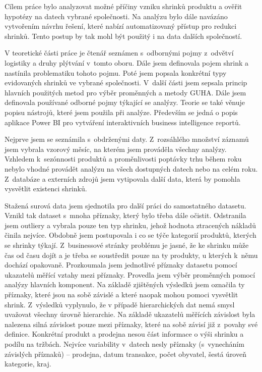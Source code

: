 Cílem práce bylo analyzovat možné příčiny vzniku shrinků produktu a ověřit hypotézy na datech vybrané společnosti. Na analýzu bylo dále navázáno vytvořením návrhu řešení, které nabízí automatizovaný přístup pro redukci shrinků. Tento postup by tak mohl být použitý i na data dalších společností.

V teoretické části práce je čtenář seznámen s~odbornými pojmy z~odvětví logistiky a druhy plýtvání v~tomto oboru. Dále jsem definovala pojem shrink a nastínila problematiku tohoto pojmu. Poté jsem popsala konkrétní typy evidovaných shrinků ve vybrané společnosti. V~další části jsem sepsala princip hlavních použitých metod pro výběr proměnných a metody GUHA. Dále jsem definovala používané odborné pojmy týkající se analýzy. Teorie se také věnuje popisu nástrojů, které jsem použila při analýze. Především se jedná o popis aplikace Power BI pro vytváření interaktivních business intelligence reportů.

Nejprve jsem se seznámila s~obdrženými daty. Z~rozsáhlého množství záznamů jsem vybrala vzorový měsíc, na kterém jsem prováděla všechny analýzy. Vzhledem k~sezónnosti produktů a proměnlivosti poptávky trhu během roku nebylo vhodné provádět analýzu na všech dostupných datech nebo na celém roku. Z~databáze a externích zdrojů jsem vytipovala další data, která by pomohla vysvětlit existenci shrinků.

Stažená surová data jsem sjednotila pro další práci do samostatného datasetu. Vznikl tak dataset s~mnoha příznaky, který bylo třeba dále očistit. Odstranila jsem outliery a vybrala pouze ten typ shrinku, jehož hodnota ztracených nákladů činila nejvíce. Obdobně jsem postupovala i co se týče kategorií produktů, kterých se shrinky týkají. Z~businessové stránky problému je jasné, že ke shrinku může čas od času dojít a je třeba se soustředit pouze na ty produkty, u kterých k~němu dochází opakovaně. 
Prozkoumala jsem jednotlivé příznaky datasetu pomocí ukazatelů měřící vztahy mezi příznaky. Provedla jsem výběr proměnných pomocí analýzy hlavních komponent. Na základě zjištěných výsledků jsem označila ty příznaky, které jsou na sobě závislé a které naopak mohou pomoci vysvětlit shrink. Z~výsledků vyplynulo, že v případě hierarchických dat nemá smysl uvažovat všechny úrovně hierarchie. Na základě ukazatelů měřících závislost byla nalezena silná závislost pouze mezi příznaky, které na sobě závisí již z~povahy své definice. Konkrétní produkt a prodejna nesou část informace o výši shrinku a podílu na tržbách. Nejvíce variability v~datech nesly příznaky (s~vynecháním závislých příznaků) -- prodejna, datum transakce, počet obyvatel, šestá úroveň kategorie, kraj.

